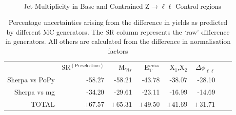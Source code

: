 \begin{figure}[h!]
{   }\\
   \caption{Jet Multiplicity in Base and Contrained Z$\rightarrow\ell\ell$ Control regions}
  \label{fig:lepnJetsZCR}
\end{figure}

\begin{table}[h]
\centering
\begin{tabular}{rrrrrrrr}
\hline
\hline
 &  SR$^{(\mathrm{Preselection})}$ &  M$_{Vis}$ &  E$_\mathrm{T}^{miss}$ &  X$_1$,X$_2$ &  $\Delta\phi_{\ell\ell}$ \\
Sherpa vs PoPy &-58.27 &-58.21 &-43.78 &-38.07 &-28.10\\
Sherpa vs mg &-34.20 &-29.61 &-23.11 &-16.99 &-14.69\\
\hline
TOTAL & $\pm  67.57 $ & $\pm  65.31 $ & $\pm  49.50 $ & $\pm  41.69 $ & $\pm  31.71 $ \\
\hline
\hline
\end{tabular}
\caption{Percentage uncertainties arising from the difference in yields as predicted by different MC generators. The SR column represents the `raw' difference in generators. All others are calculated from the difference in normalisation factors}
\label{table:uncertainties}
\end{table}